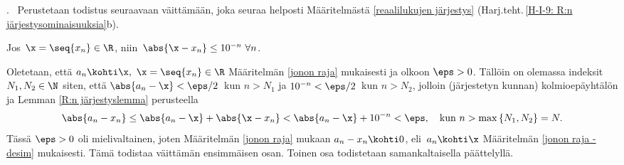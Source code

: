 . \ Perustetaan todistus seuraavaan
väittämään, joka seuraa helposti Määritelmästä \ref{reaalilukujen järjestys}
(Harj.teht.\,\ref{H-I-9: R:n järjestysominaisuuksia}b).
\begin{Lem} \label{R:n järjestyslemma} Jos $\,\x=\seq{x_n}\in\R$, niin 
$\,\abs{\x-x_n} \le 10^{-n}\ \forall n$.
\end{Lem}
Oletetaan, että $a_n \kohti \x,\ \x=\seq{x_n}\in\R$ Määritelmän \ref{jonon raja} 
mukaisesti ja olkoon $\eps > 0$. Tällöin on olemassa indeksit $N_1,N_2 \in \N$ siten, että 
$\abs{a_n-\x} < \eps/2\,$ kun $n > N_1$ ja $10^{-n} < \eps/2\,$ kun $n > N_2$, jolloin 
(järjestetyn kunnan) kolmioepäyhtälön ja Lemman \ref{R:n järjestyslemma} perusteella
\[
\abs{a_n-x_n} \le \abs{a_n-\x} + \abs{\x-x_n} < \abs{a_n-\x} + 10^{-n} 
              < \eps, \quad \text{kun}\ n > \max\,\{N_1,N_2\} = N.
\]
Tässä $\eps > 0$ oli mielivaltainen, joten Määritelmän \ref{jonon raja} mukaan 
$a_n-x_n \kohti 0$, eli $\,a_n \kohti \x$ Määritelmän \ref{jonon raja - desim} mukaisesti.
Tämä todistaa väittämän ensimmäisen osan. Toinen osa todistetaan samankaltaisella 
päättelyllä. \loppu

